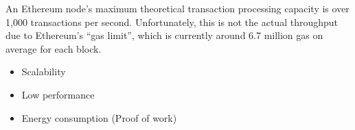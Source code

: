 An Ethereum node’s maximum theoretical transaction processing capacity is over 1,000 transactions per second. Unfortunately, this is not the actual throughput due to Ethereum’s “gas limit”, which is currently around 6.7 million gas on average for each block. \cite{gaslimit}

\begin{itemize}
\item Scalability
\item Low performance
\item Energy consumption (Proof of work)
\end{itemize}